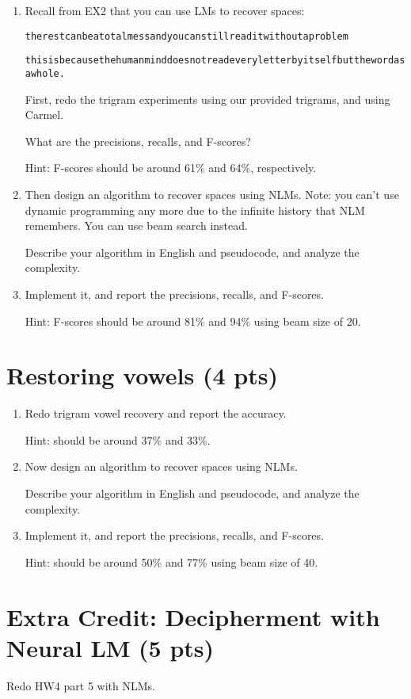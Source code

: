 \documentclass{article}
\begin{document}
\begin{enumerate}
\item 

Recall from EX2 that you can use LMs to recover spaces:

\verb|therestcanbeatotalmessandyoucanstillreaditwithoutaproblem|

\verb|thisisbecausethehumanminddoesnotreadeveryletterbyitselfbutthewordasawhole.|

First, redo the trigram experiments using our provided trigrams, and using Carmel.

What are the precisions, recalls, and F-scores?

Hint: F-scores should be around 61\% and 64\%, respectively.

\item
Then design an algorithm to recover spaces using NLMs. 
Note: you can't use dynamic programming any more due to the infinite history that NLM remembers. You can use beam search instead.

Describe your algorithm in English and pseudocode, and analyze the complexity.

\item
Implement it, and report the precisions, recalls, and F-scores.

Hint: F-scores should be around 81\% and 94\% using beam size of 20.

\end{enumerate}

\section{Restoring vowels (4 pts)}

\begin{enumerate}
\item Redo trigram vowel recovery and report the accuracy.

Hint: should be around 37\% and 33\%.

\item Now design an algorithm to recover spaces using NLMs.

Describe your algorithm in English and pseudocode, and analyze the complexity.

\item
Implement it, and report the precisions, recalls, and F-scores.

Hint: should be around 50\% and 77\% using beam size of 40.


\end{enumerate}

\section{Extra Credit: Decipherment with Neural LM (5 pts)}

Redo HW4 part 5 with NLMs.
\end{document}
